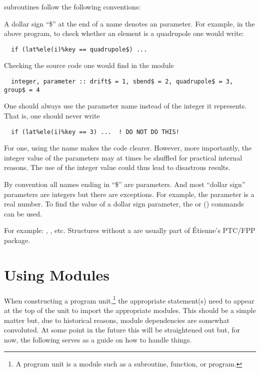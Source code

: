 {{{{{{\bmad subroutines follow the following conventions:

\begin{description}

\item[A ``\$'' suffix denotes a parameter:] 
A dollar sign ``\$'' at the end of a name denotes an 
parameter. For example, in the above program, to check
whether an element is a quadrupole one would write:
\begin{verbatim}
  if (lat%ele(i)%key == quadrupole$) ...
\end{verbatim}
Checking the source code one would find in the module 
\begin{verbatim}
  integer, parameter :: drift$ = 1, sbend$ = 2, quadrupole$ = 3, group$ = 4
\end{verbatim}
One should always use the parameter name instead of the integer it represents.
That is, one should never write
\begin{verbatim}
  if (lat%ele(i)%key == 3) ...  ! DO NOT DO THIS!
\end{verbatim}
For one, using the name makes the code clearer. However, more
importantly, the integer value of the parameters may at times be
shuffled for practical internal reasons. The use of the integer value
could thus lead to disastrous results. 

By convention all names ending in ``\$'' are parameters. And most ``dollar sign'' parameters are
integers but there are exceptions. For example, the parameter  is a real number.
To find the value of a dollar sign parameter, the  or  () commands
can be used.

\item[Structure names have a ``_struct'' suffix:]
For example: , , etc. Structures without a 
 are usually part of \'Etienne's PTC/FPP package.

\end{description}

\section {Using Modules}
\label{s:modules}

When constructing a program unit,\footnote
  {
A program unit is a module such as a subroutine, function, or program.
  }
the appropriate  statement(s) need to appear at the top of the unit to import the
appropriate modules. This should be a simple matter but, due to historical reasons, \bmad module
dependencies are somewhat convoluted. At some point in the future this will be straightened out
but, for now, the following serves as a guide on how to handle things.

}}}}}}
